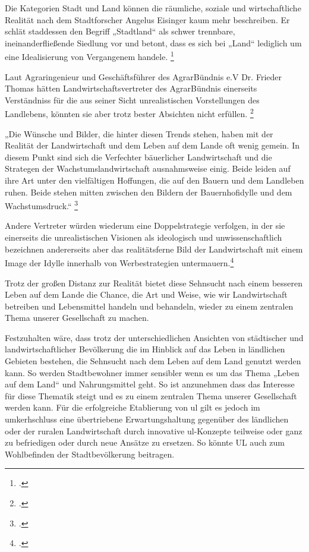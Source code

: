 \documentclass{scrartcl}
\begin{document}
Die Kategorien Stadt und Land können die räumliche, soziale und wirtschaftliche Realität nach dem Stadtforscher Angelus Eisinger kaum mehr beschreiben. Er schlät staddessen den Begriff „Stadtland“ als schwer trennbare, ineinanderfließende Siedlung vor und betont, dass es sich bei „Land“ lediglich um eine Idealisierung von Vergangenem handele. \footcite[Vgl.][S. 40]{Egnolff2015DieIdeal}

Laut Agraringenieur und Geschäftsführer des AgrarBündnis e.V Dr. Frieder Thomas hätten Landwirtschaftsvertreter des AgrarBündnis einerseits Verständniss für die aus seiner Sicht unrealistischen Vorstellungen des Landlebens, könnten sie aber trotz bester Absichten nicht erfüllen. \footcite[Vgl.][S. 27]{Thomas2015BauerlichkeitBegriff}

\begin{displayquote}
„Die Wünsche und Bilder, die hinter diesen Trends stehen, haben mit der Realität der Landwirtschaft und dem Leben auf dem Lande oft wenig gemein. In diesem Punkt sind sich die Verfechter bäuerlicher Landwirtschaft und die Strategen der Wachstumslandwirtschaft ausnahmsweise einig. Beide leiden auf ihre Art unter den vielfältigen Hoffungen, die auf den Bauern und dem Landleben ruhen. Beide stehen mitten zwischen den Bildern der Bauernhofidylle und dem Wachstumsdruck.“ \footcite[S. 27]{Thomas2015BauerlichkeitBegriff}
\end{displayquote}

Andere Vertreter würden wiederum eine Doppelstrategie verfolgen, in der sie einerseits die unrealistischen Visionen als ideologisch und unwissenschaftlich bezeichnen andererseits aber das realitätsferne Bild der Landwirtschaft mit einem Image der Idylle innerhalb von Werbestrategien untermauern.\footcite[S. 27f]{Thomas2015BauerlichkeitBegriff}

Trotz der großen Distanz zur Realität bietet diese Sehnsucht nach einem besseren Leben auf dem Lande die Chance, die Art und Weise, wie wir Landwirtschaft betreiben und Lebensmittel handeln und behandeln, wieder zu einem zentralen Thema unserer Gesellschaft zu machen.

Festzuhalten wäre, dass trotz der unterschiedlichen Ansichten von städtischer und landwirtschaftlicher Bevölkerung die im Hinblick auf das Leben in ländlichen Gebieten bestehen, die Sehnsucht nach dem Leben auf dem Land genutzt werden kann. So werden Stadtbewohner immer sensibler wenn es um das Thema „Leben auf dem Land“ und Nahrungsmittel geht. So ist anzunehmen dass das Interesse für diese Thematik steigt und es zu einem zentralen Thema unserer Gesellschaft werden kann. Für die erfolgreiche Etablierung von \acs{ul} gilt es jedoch im umkerhschluss eine übertriebene Erwartungshaltung gegenüber des ländlichen oder der ruralen Landwirtschaft durch innovative \acs{ul}-Konzepte teilweise oder ganz zu befriedigen oder durch neue Ansätze zu ersetzen. So könnte UL auch zum Wohlbefinden der Stadtbevölkerung beitragen.
\end{document}
